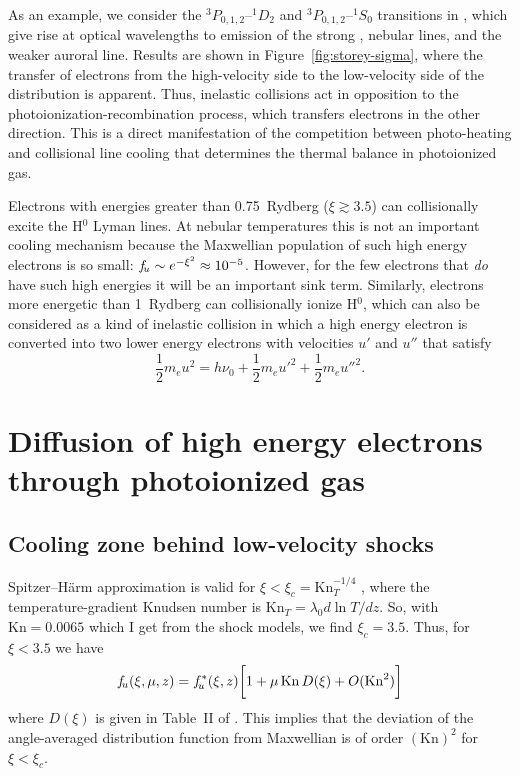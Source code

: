 \documentclass{emulateapj}
\newcommand\Kn{\ensuremath{\mathrm{Kn}}}
\begin{document}
As an example, we consider the \({}^3P_{0,1,2}\)--\({}^1D_2\)
and \({}^3P_{0,1,2}\)--\({}^1S_0\)
transitions in \oiii{}, which give rise at optical wavelengths to
emission of the strong ,  nebular lines, and the
weaker  auroral line.  Results are shown in
Figure~\ref{fig:storey-sigma}, where the transfer of electrons from
the high-velocity side to the low-velocity side of the distribution is
apparent.  Thus, inelastic collisions act in opposition to the
photoionization-recombination process, which transfers electrons in
the other direction.  This is a direct manifestation of the competition
between photo-heating and collisional line cooling that determines the
thermal balance in photoionized gas.


Electrons with energies greater than 0.75~Rydberg (\(\xi \gtrsim
3.5\)) can collisionally excite the H\(^0\) Lyman lines.  At nebular
temperatures this is not an important cooling mechanism because the
Maxwellian population of such high energy electrons is so small: \(f_{\!u}
\sim e^{-\xi^2} \approx 10^{-5}\).  However, for the few electrons that
\emph{do} have such high energies it will be an important sink term.
Similarly, electrons more energetic than 1~Rydberg can collisionally
ionize H\(^0\), which can also be considered as a kind of inelastic
collision in which a high energy electron is converted into two lower
energy electrons with velocities \(u'\) and \(u''\) that satisfy 
\begin{equation}
  \label{eq:12}
  \frac12 m_e u^2 = h\nu_0 + \frac12 m_e u'^2 + \frac12 m_e u''^2 .
\end{equation}
 



\section{Diffusion of high energy electrons through photoionized gas}
\label{sec:diff-high-energy}


\subsection{Cooling zone behind low-velocity shocks}
\label{sec:cooling-zone-behind}

Spitzer--Härm approximation is valid for \(\xi < \xi_c =
\Kn_{T}^{-1/4}\) \citep{Shoub:1983a}, where the temperature-gradient Knudsen number is
\(\Kn_T = \lambda_0 d\ln T/ d z\). So, with \(\Kn = 0.0065\) which I
get from the shock models, we find \(\xi_c = 3.5\). Thus, for \(\xi <
3.5\) we have 
\begin{equation}
  \label{eq:7}
  \fu(\xi, \mu, z) = \fu^*(\xi, z) \biggl[ 
  1 + \mu\, \Kn\, D(\xi) + O(\Kn^2)
  \biggr]
\end{equation}
where \(D(\xi)\) is given in Table~II of \citet{Spitzer:1953a}.  This
implies that the deviation of the angle-averaged distribution function
from  Maxwellian is of order \((\Kn)^2\) for \(\xi < \xi_c\).
\end{document}
